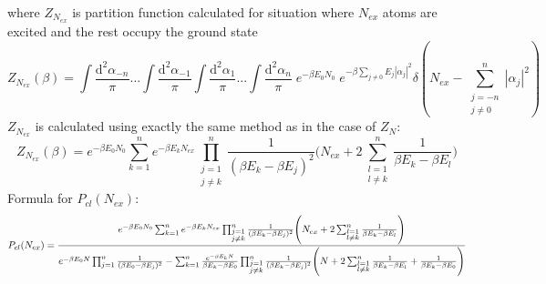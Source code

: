 \documentclass{article}
\begin{document}
where $Z_{N_{ex}}$ is partition function calculated for situation where $N_{ex}$ atoms are excited and the rest occupy the ground state
\begin{equation*}
    Z_{N_{ex}}(\beta)=\int \frac{\mathrm{d}^2 \alpha_{-n}}{\pi}... \int \frac{\mathrm{d}^2 \alpha_{-1}}{\pi} \int \frac{\mathrm{d}^2 \alpha_{1}}{\pi} ... \int \frac{\mathrm{d}^2 \alpha_{n}}{\pi} \; e^{-\beta E_0 N_0} \; e^{- \beta \sum_{j \neq0} E_j |\alpha_j|^2} \delta (N_{ex}-\sum_{\substack{j=-n\\j \neq 0}}^n  |\alpha_j|^2)
\end{equation*}
$Z_{N_{ex}}$ is calculated using exactly the same method as in the case of $Z_N$:
\begin{equation*}
Z_{N_{ex}}(\beta)=e^{-\beta E_0 N_0}\sum_{k=1}^n e^{-\beta E_k N_{ex}} \prod_{\substack{j=1\\j \neq k}}^n \frac{1}{(\beta E_k -\beta E_j)^2} \Bigg(N_{ex}+2\sum_{\substack{l=1\\l \neq k}}^n \frac{1}{\beta E_k-\beta E_l}\Bigg)
\end{equation*}
Formula for $P_{cl}(N_{ex})$:
    \begin{equation*}
    P_{cl}(N_{ex})=\frac{e^{-\beta E_0 N_0}\sum_{k=1}^n e^{-\beta E_k N_{ex}} \prod_{\substack{j=1\\j \neq k}}^n \frac{1}{(\beta E_k -\beta E_j)^2} \Bigg(N_{ex}+2\sum_{\substack{l=1\\l \neq k}}^n \frac{1}{\beta E_k-\beta E_l}\Bigg)}{e^{-\beta E_0 N} \prod_{j=1}^n \frac{1}{(\beta E_0 -\beta E_j)^2}\\-\sum_{k=1}^n  \frac{e^{-\beta E_k N}}{\beta E_k- \beta E_0} \prod_{\substack{j=1\\j \neq k}}^n \frac{1}{(\beta E_k -\beta E_j)^2}\Bigg(N+2\sum_{\substack{l=1\\l \neq k}}^n \frac{1}{\beta E_k-\beta E_l}+ \frac{1}{\beta E_k -\beta E_0}\Bigg) }
   \end{equation*}
\end{document}
